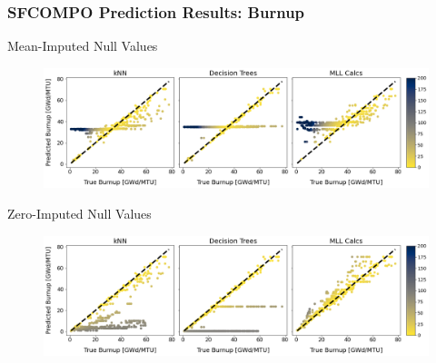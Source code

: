 \begin{frame}
  \frametitle{SFCOMPO Prediction Results: Burnup}
  \vspace{-5pt}
  \begin{block}{Mean-Imputed Null Values}
    \begin{figure}
      \centering
      \includegraphics[height=0.35\textheight]{./figures/sfcompo_truey_vs_predy_impnull__burn.png}
    \end{figure}
  \end{block}
  \vspace{-5pt}
  \begin{block}{Zero-Imputed Null Values}
    \begin{figure}
      \centering
      \includegraphics[height=0.35\textheight]{./figures/sfcompo_truey_vs_predy_0null__burn.png}
    \end{figure}
  \end{block}
\end{frame}

